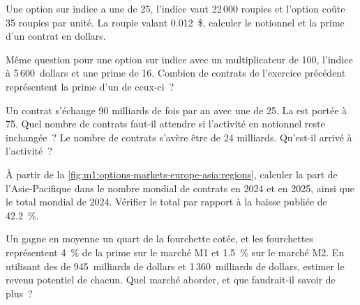 \begin{exercise}[$\star$]\label{exo:m1:options-markets-europe-asia:1}
Une option sur indice a une  de 25, l'indice vaut 22\,000 roupies et
l'option coûte 35 roupies par unité. La roupie valant 0.012~\$, calculer le notionnel
et la prime d'un contrat en dollars.
\end{exercise}

\begin{exercise}[$\star$]\label{exo:m1:options-markets-europe-asia:2}
Même question pour une option sur indice avec un multiplicateur de 100, l'indice à 5\,600~dollars
et une prime de 16. Combien de contrats de l'exercice précédent représentent la
prime d'un de ceux-ci~?
\end{exercise}

\begin{exercise}[$\star$]\label{exo:m1:options-markets-europe-asia:3}
Un contrat s'échange 90 milliards de fois par an avec une  de 25. La  est portée
à 75. Quel nombre de contrats faut-il attendre si l'activité en notionnel reste inchangée~? Le
nombre de contrats s'avère être de 24 milliards. Qu'est-il arrivé à l'activité~?
\end{exercise}

\begin{exercise}[$\star\star$]\label{exo:m1:options-markets-europe-asia:4}
À partir de la \cref{fig:m1:options-markets-europe-asia:regions}, calculer la part de l'Asie-Pacifique
dans le nombre mondial de contrats en 2024 et en 2025, ainsi que le total mondial de 2024.
Vérifier le total par rapport à la baisse publiée de 42.2~\%.
\end{exercise}

\begin{exercise}[$\star\star$]\label{exo:m1:options-markets-europe-asia:5}
Un  gagne en moyenne un quart de la fourchette cotée, et les fourchettes représentent
4~\% de la prime sur le marché M1 et 1.5~\% sur le marché M2. En utilisant des  de
945~milliards de dollars et 1\,360~milliards de dollars, estimer le revenu potentiel de chacun. Quel
marché aborder, et que faudrait-il savoir de plus~?
\end{exercise}

